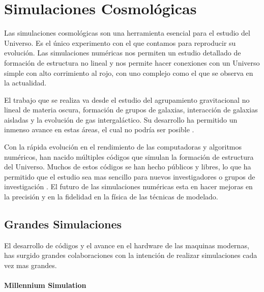 
\chapter{Simulaciones Cosmológicas}
\label{chap:2 Sim}
\setcounter{equation}{0}

Las simulaciones cosmológicas son una herramienta esencial para el estudio del Universo. Es el único experimento con el que contamos para reproducir su evolución. Las simulaciones numéricas nos permiten un estudio detallado de formación de estructura no lineal y nos permite hacer conexiones con un Universo simple con alto corrimiento al rojo, con uno complejo como el que se observa en la actualidad.

El trabajo que se realiza va desde el estudio del agrupamiento gravitacional no lineal de materia oscura, formación de grupos de galaxias, interacción de galaxias aisladas y la evolución de gas intergaláctico. Su desarrollo ha permitido un inmenso avance en estas áreas, el cual no podría ser posible  \cite{2001NewA....6...79S}.


Con la rápida evolución en el rendimiento de las computadoras y algoritmos numéricos, han nacido múltiples códigos que simulan la formación de estructura del Universo. Muchos de estos códigos se han hecho públicos y libres, lo que ha permitido que el estudio sea mas sencillo para nuevos investigadores o grupos de investigación \cite{2021MNRAS.506.2871S}. El futuro de las simulaciones numéricas esta en hacer mejoras en la precisión y en la fidelidad en la física de las técnicas de modelado.


\section{Grandes Simulaciones}

El desarrollo de códigos y el avance en el hardware de las maquinas modernas, has surgido grandes colaboraciones con la intención de realizar simulaciones cada vez mas grandes.

\subsubsection{Millennium Simulation}

